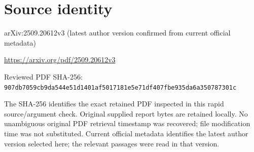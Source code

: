 \documentclass[11pt]{article}
\begin{document}
\section*{Source identity}

arXiv:2509.20612v3 (latest author version confirmed from current official metadata)

\url{https://arxiv.org/pdf/2509.20612v3}

Reviewed PDF SHA-256: \nolinkurl{907db7059cb9da544e51d1401af5017181e5e71df407fbe935da6a350787301c}

The SHA-256 identifies the exact retained PDF inspected in this rapid source/argument check. Original supplied report bytes are retained locally. No unambiguous original PDF retrieval timestamp was recovered; file modification time was not substituted. Current official metadata identifies the latest author version selected here; the relevant passages were read in that version.
\end{document}
